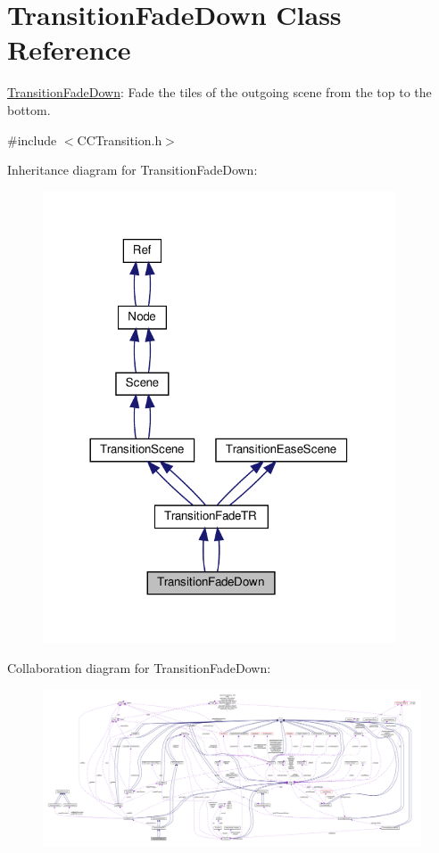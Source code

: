\hypertarget{classTransitionFadeDown}{}\section{Transition\+Fade\+Down Class Reference}
\label{classTransitionFadeDown}


\hyperlink{classTransitionFadeDown}{Transition\+Fade\+Down}\+: Fade the tiles of the outgoing scene from the top to the bottom.  




{\ttfamily \#include $<$C\+C\+Transition.\+h$>$}



Inheritance diagram for Transition\+Fade\+Down\+:
\nopagebreak
\begin{figure}[H]
\begin{center}
\leavevmode
\includegraphics[width=296pt]{classTransitionFadeDown__inherit__graph}
\end{center}
\end{figure}


Collaboration diagram for Transition\+Fade\+Down\+:
\nopagebreak
\begin{figure}[H]
\begin{center}
\leavevmode
\includegraphics[width=350pt]{classTransitionFadeDown__coll__graph}
\end{center}
\end{figure}

